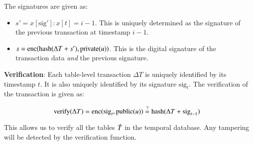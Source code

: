 The signatures are given as:

\begin{itemize}
    \item $s' = x[\mathrm{sig'}]: x[t] = i-1$. This is uniquely determined as the
        signature of the previous transaction at timestamp $i-1$.
    \item $s = \operatorname{enc}(\mathrm{hash}(\Delta T + s'), \operatorname{private}(u))$. This is the
        digital signature of the transaction data {\em and} the previous
        signature.
\end{itemize}

\medskip

{\bf Verification}: \quad Each table-level transaction $\Delta T$ is uniquely
identified by its timestamp $t$.  It is also uniquely identified by its
signature $\mathrm{sig}_t$.  The verification of the transaction is given as:

$$\mathrm{verify}(\Delta T) = \operatorname{enc}(\mathrm{sig}_t, \operatorname{public}(u)) 
    \overset{?}= \mathrm{hash}(\Delta T + \mathrm{sig}_{t-1}) $$

This allows us to verify all the tables $\Hat T$ in the temporal database.  Any
tampering will be detected by the verification function.


